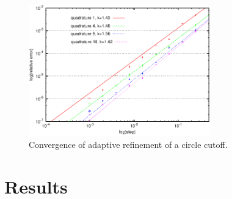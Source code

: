 \documentclass[preprint,12pt,authoryear]{elsarticle}
\newcommand{\figpath}{../graphics/}
\begin{document}
\begin{figure}[!htb]
  \centering    
  \includegraphics[width=0.7\textwidth]{results/adaptive_integration.pdf}
  \caption[Adaptive refinement convergence]{Convergence of adaptive refinement of a circle cutoff.}
  \label{fig:adapt_ref_convergence}
\end{figure}

% 
% 

\section{Results}
\label{sec:results}
\end{document}
